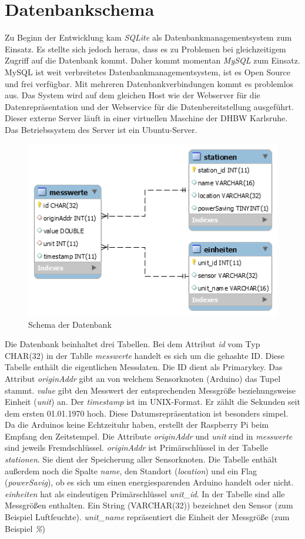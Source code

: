 \section{Datenbankschema}
\label{sec:db}
Zu Beginn der Entwicklung kam \textit{SQLite} als Datenbankmanagementsystem zum Einsatz. Es stellte sich jedoch heraus, dass es zu Problemen bei gleichzeitigem Zugriff auf die Datenbank kommt. Daher kommt momentan \textit{MySQL} zum Einsatz. MySQL ist weit verbreitetes Datenbankmanagementsystem, ist es Open Source und frei verfügbar. Mit mehreren Datenbankverbindungen kommt es problemlos aus. Das System wird auf dem gleichen Host wie der Webserver für die Datenrepräsentation und der Webservice für die Datenbereitstellung ausgeführt. Dieser externe Server läuft in einer virtuellen Maschine der DHBW Karlsruhe. Das Betriebssystem des Server ist ein Ubuntu-Server. 
\begin{figure}[h!]
\includegraphics[scale=0.8]{bilder/EERDiagramm} 
\caption{Schema der Datenbank}
\label{Datenbankschema}
\end{figure}   
Die Datenbank beinhaltet drei Tabellen. Bei dem Attribut \textit{id} vom Typ CHAR(32) in der Tablle \textit{messwerte} handelt es sich um die gehashte ID. Diese Tabelle enthält die eigentlichen Messdaten. Die ID dient als Primarykey. Das Attribut \textit{originAddr} gibt an von welchem Sensorknoten (Arduino) das Tupel stammt. \textit{value} gibt den Messwert der entsprechenden Messgröße beziehungsweise Einheit (\textit{unit}) an. Der \textit{timestamp} ist im UNIX-Format. Er zählt die Sekunden seit dem ersten 01.01.1970 hoch. Diese Datumsrepräsentation ist besonders simpel. Da die Arduinos keine Echtzeituhr haben, erstellt der Raspberry Pi beim Empfang den Zeitstempel.
Die Attribute \textit{originAddr} und \textit{unit} sind in \textit{messwerte} sind jeweils Fremdschlüssel. \textit{originAddr} ist Primärschlüssel in der Tabelle \textit{stationen}. Sie dient der Speicherung aller Sensorknoten. Die Tabelle enthält außerdem noch die Spalte \textit{name}, den Standort (\textit{location}) und ein Flag (\textit{powerSavig}), ob es sich um einen energiesparenden Arduino handelt oder nicht.
\textit{einheiten} hat als eindeutigen Primärschlüssel \textit{unit\_id}. In der Tabelle sind alle Messgrößen enthalten. Ein String (VARCHAR(32)) bezeichnet den Sensor (zum Beispiel Luftfeuchte). \textit{unit\_name} repräsentiert die Einheit der Messgröße (zum Beispiel \textit{\%}) 
